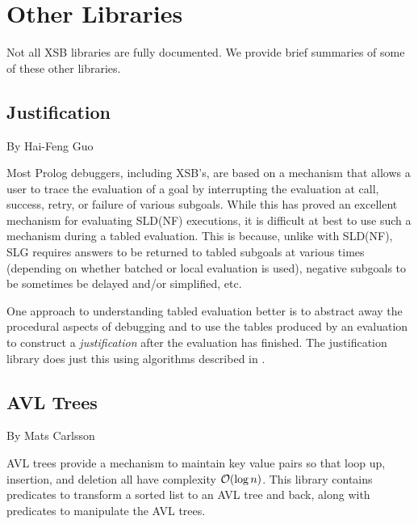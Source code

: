 \section{Other Libraries}

Not all XSB libraries are fully documented.  We provide brief
summaries of some of these other libraries.

\subsection{Justification}
%
By Hai-Feng Guo

Most Prolog debuggers, including XSB's, are based on a mechanism that
allows a user to trace the evaluation of a goal by interrupting the
evaluation at call, success, retry, or failure of various subgoals.
While this has proved an excellent mechanism for evaluating SLD(NF)
executions, it is difficult at best to use such a mechanism during a
tabled evaluation.  This is because, unlike with SLD(NF), SLG requires
answers to be returned to tabled subgoals at various times (depending
on whether batched or local evaluation is used), negative subgoals to
be sometimes be delayed and/or simplified, etc.

One approach to understanding tabled evaluation better is to abstract
away the procedural aspects of debugging and to use the tables
produced by an evaluation to construct a {\em justification} after the
evaluation has finished.  The justification library does just this
using algorithms described in \cite{GuRR01}.

\subsection{AVL Trees}

By Mats Carlsson

AVL trees provide a mechanism to maintain key value pairs so that loop
up, insertion, and deletion all have complexity ${\cal O}(\log n)$.  This
library contains predicates to transform a sorted list to an AVL tree
and back, along with predicates to manipulate the AVL trees. 




